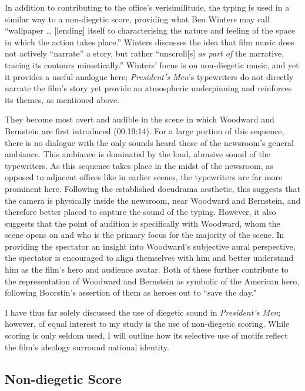 In addition to contributing to the office's verisimilitude, the typing is used in a similar way to a non-diegetic score, providing what Ben Winters may call ``wallpaper … [lending] itself to characterising the nature and feeling of the space in which the action takes place.”\autocites[][43]{winters_musical_2012}
Winters discusses the idea that film music does not actively “narrate” a story, but rather ``unscroll[s] \textit{as part of }the narrative, tracing its contours mimetically.”\autocites[][41]{winters_musical_2012}
Winters’ focus is on non-diegetic music, and yet it provides a useful analogue here;
\textit{President’s Men}’s typewriters do not directly narrate the film’s story yet provide an atmospheric underpinning and reinforces its themes, as mentioned above.

They become most overt and audible in the scene in which Woodward and Bernstein are first introduced (00:19:14).
For a large portion of this sequence, there is no dialogue with the only sounds heard those of the newsroom's general ambiance.
This ambiance is dominated by the loud, abrasive sound of the typewriters.
As this sequence takes place in the midst of the newsroom, as opposed to adjacent offices like in earlier scenes, the typewriters are far more prominent here.
Following the established docudrama aesthetic, this suggests that the camera is physically inside the newsroom, near Woodward and Bernstein, and therefore better placed to capture the sound of the typing.
However, it also suggests that the point of audition is specifically with Woodward, whom the scene opens on and who is the primary focus for the majority of the scene.
In providing the spectator an insight into Woodward's subjective aural perspective, the spectator is encouraged to align themselves with him and better understand him as the film's hero and audience avatar.
Both of these further contribute to the representation of Woodward and Bernstein as symbolic of the American hero, following Boorstin's assertion of them as heroes out to ``save the day."\autocites[Boorstin, quoted in][]{hornaday_how_2022}

I have thus far solely discussed the use of diegetic sound in \textit{President’s Men}; however, of equal interest to my study is the use of non-diegetic scoring.
While scoring is only seldom used, I will outline how its selective use of motifs reflect the film's ideology surround national identity.

\subsection{Non-diegetic Score}

